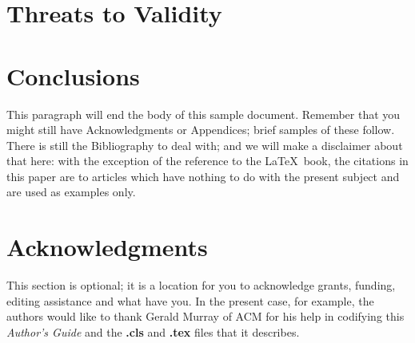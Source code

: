 \documentclass{sig-alternate-05-2015}
\begin{document}
\section{Threats to Validity}

\section{Conclusions}
This paragraph will end the body of this sample document.
Remember that you might still have Acknowledgments or
Appendices; brief samples of these
follow.  There is still the Bibliography to deal with; and
we will make a disclaimer about that here: with the exception
of the reference to the \LaTeX\ book, the citations in
this paper are to articles which have nothing to
do with the present subject and are used as
examples only.

\section{Acknowledgments}
This section is optional; it is a location for you
to acknowledge grants, funding, editing assistance and
what have you.  In the present case, for example, the
authors would like to thank Gerald Murray of ACM for
his help in codifying this \textit{Author's Guide}
and the \textbf{.cls} and \textbf{.tex} files that it describes.

%

  
\end{document}
